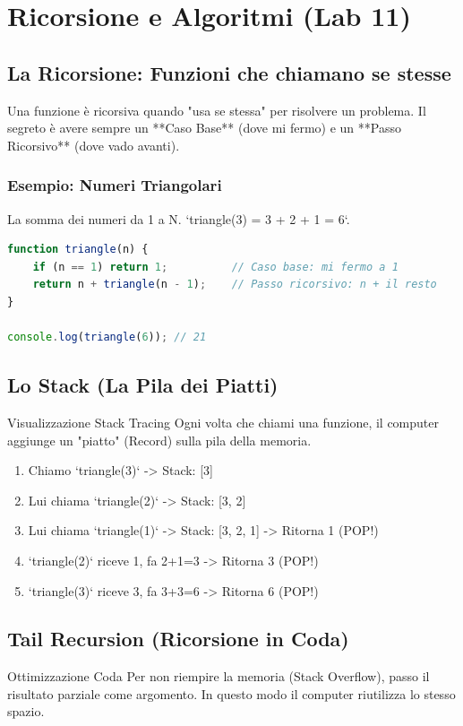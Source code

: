 \section{Ricorsione e Algoritmi (Lab 11)}

\subsection{La Ricorsione: Funzioni che chiamano se stesse}
Una funzione è ricorsiva quando "usa se stessa" per risolvere un problema.
Il segreto è avere sempre un **Caso Base** (dove mi fermo) e un **Passo Ricorsivo** (dove vado avanti).

\subsubsection{Esempio: Numeri Triangolari}
La somma dei numeri da 1 a N. `triangle(3) = 3 + 2 + 1 = 6`.

\begin{lstlisting}[language=JavaScript]
function triangle(n) {
    if (n == 1) return 1;          // Caso base: mi fermo a 1
    return n + triangle(n - 1);    // Passo ricorsivo: n + il resto
}

console.log(triangle(6)); // 21
\end{lstlisting}

\subsection{Lo Stack (La Pila dei Piatti)}
\begin{concept}{Visualizzazione Stack Tracing}
Ogni volta che chiami una funzione, il computer aggiunge un "piatto" (Record) sulla pila della memoria.
\begin{enumerate}
    \item Chiamo `triangle(3)` -> Stack: [3]
    \item Lui chiama `triangle(2)` -> Stack: [3, 2]
    \item Lui chiama `triangle(1)` -> Stack: [3, 2, 1] -> Ritorna 1 (POP!)
    \item `triangle(2)` riceve 1, fa 2+1=3 -> Ritorna 3 (POP!)
    \item `triangle(3)` riceve 3, fa 3+3=6 -> Ritorna 6 (POP!)
\end{enumerate}
\end{concept}

\subsection{Tail Recursion (Ricorsione in Coda)}
\begin{concept}{Ottimizzazione Coda}
Per non riempire la memoria (Stack Overflow), passo il risultato parziale come argomento.
In questo modo il computer riutilizza lo stesso spazio.
\end{concept}

